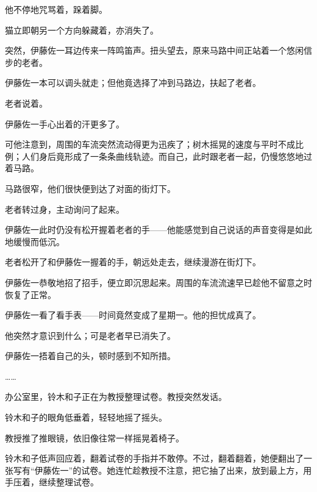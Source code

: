 他不停地咒骂着，跺着脚。

猫立即朝另一个方向躲藏着，亦消失了。

突然，伊藤佐一耳边传来一阵鸣笛声。扭头望去，原来马路中间正站着一个悠闲信步的老者。

伊藤佐一本可以调头就走；但他竟选择了冲到马路边，扶起了老者。

老者说着。

伊藤佐一手心出着的汗更多了。

可他注意到，周围的车流突然流动得更为迅疾了；树木摇晃的速度与平时不成比例；人们身后竟形成了一条条曲线轨迹。而自己，此时跟老者一起，仍慢悠悠地过着马路。

马路很窄，他们很快便到达了对面的街灯下。

老者转过身，主动询问了起来。

伊藤佐一此时仍没有松开握着老者的手——他能感觉到自己说话的声音变得是如此地缓慢而低沉。


老者松开了和伊藤佐一握着的手，朝远处走去，继续漫游在街灯下。

伊藤佐一恭敬地招了招手，便立即沉思起来。周围的车流流速早已趁他不留意之时恢复了正常。

伊藤佐一看了看手表——时间竟然变成了星期一。他的担忧成真了。


他突然才意识到什么；可是老者早已消失了。


伊藤佐一捂着自己的头，顿时感到不知所措。

……

办公室里，铃木和子正在为教授整理试卷。教授突然发话。


铃木和子的眼角低垂着，轻轻地摇了摇头。

教授推了推眼镜，依旧像往常一样摇晃着椅子。

铃木和子低声回应着，翻着试卷的手指并不敢停。不过，翻着翻着，她便翻出了一张写有“伊藤佐一”的试卷。她连忙趁教授不注意，把它抽了出来，放到最上方，用手压着，继续整理试卷。

